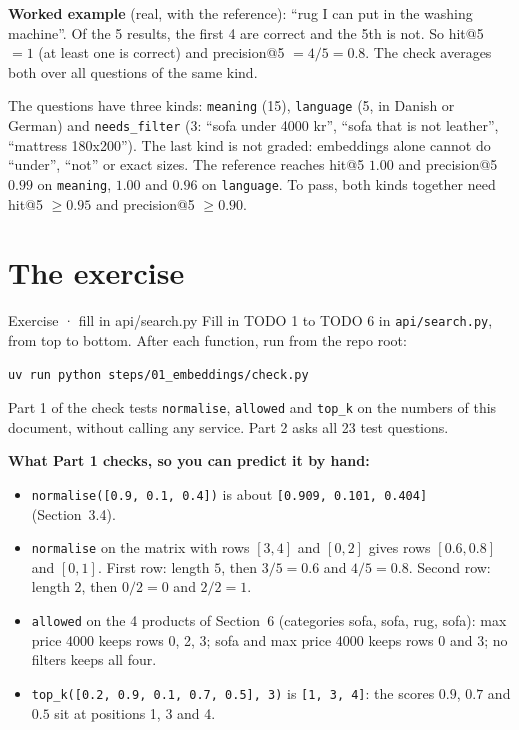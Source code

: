 \documentclass[11pt,a4paper]{article}
\newcommand{\code}[1]{\texttt{#1}}
\begin{document}
\textbf{Worked example} (real, with the reference): ``rug I can put in
the washing machine''. Of the 5 results, the first 4 are correct and the
5th is not. So hit@5 $= 1$ (at least one is correct) and precision@5 $=
4 / 5 = 0.8$. The check averages both over all questions of the same
kind.

The questions have three kinds: \code{meaning} (15), \code{language} (5,
in Danish or German) and \code{needs\_filter} (3: ``sofa under 4000
kr'', ``sofa that is not leather'', ``mattress 180x200''). The last kind
is not graded: embeddings alone cannot do ``under'', ``not'' or exact
sizes. The reference reaches hit@5 $1.00$ and precision@5 $0.99$ on
\code{meaning}, $1.00$ and $0.96$ on \code{language}. To pass, both kinds
together need hit@5 $\geq 0.95$ and precision@5 $\geq 0.90$.

\section{The exercise}

\begin{task}{Exercise · fill in api/search.py}
Fill in TODO 1 to TODO 6 in \code{api/search.py}, from top to bottom.
After each function, run from the repo root:
\begin{lstlisting}[backgroundcolor=\color{white}]
uv run python steps/01_embeddings/check.py
\end{lstlisting}
Part 1 of the check tests \code{normalise}, \code{allowed} and
\code{top\_k} on the numbers of this document, without calling any
service. Part 2 asks all 23 test questions.
\end{task}

\textbf{What Part 1 checks, so you can predict it by hand:}
\begin{itemize}[leftmargin=1.4em, itemsep=0.2em]
  \item \code{normalise([0.9, 0.1, 0.4])} is about \code{[0.909, 0.101,
        0.404]} (Section~3.4).
  \item \code{normalise} on the matrix with rows $[3, 4]$ and $[0, 2]$
        gives rows $[0.6, 0.8]$ and $[0, 1]$. First row: length $5$, then
        $3/5 = 0.6$ and $4/5 = 0.8$. Second row: length $2$, then $0/2 =
        0$ and $2/2 = 1$.
  \item \code{allowed} on the 4 products of Section~6 (categories sofa,
        sofa, rug, sofa): max price 4000 keeps rows 0, 2, 3; sofa and max
        price 4000 keeps rows 0 and 3; no filters keeps all four.
  \item \code{top\_k([0.2, 0.9, 0.1, 0.7, 0.5], 3)} is \code{[1, 3, 4]}:
        the scores $0.9$, $0.7$ and $0.5$ sit at positions 1, 3 and 4.
\end{itemize}
\end{document}
